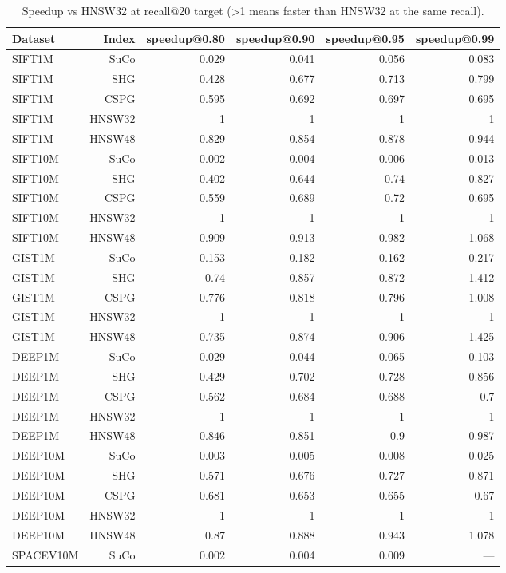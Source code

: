 \begin{table}[t]
\centering
\small
\caption{Speedup vs HNSW32 at recall@20 target (>1 means faster than HNSW32 at the same recall).}
\label{tab:speedup-k20}
\begin{tabular}{lrrrrr}
\toprule
Dataset & Index & speedup@0.80 & speedup@0.90 & speedup@0.95 & speedup@0.99 \\
\midrule
SIFT1M & SuCo & 0.029 & 0.041 & 0.056 & 0.083 \\
SIFT1M & SHG & 0.428 & 0.677 & 0.713 & 0.799 \\
SIFT1M & CSPG & 0.595 & 0.692 & 0.697 & 0.695 \\
SIFT1M & HNSW32 & 1 & 1 & 1 & 1 \\
SIFT1M & HNSW48 & 0.829 & 0.854 & 0.878 & 0.944 \\
SIFT10M & SuCo & 0.002 & 0.004 & 0.006 & 0.013 \\
SIFT10M & SHG & 0.402 & 0.644 & 0.74 & 0.827 \\
SIFT10M & CSPG & 0.559 & 0.689 & 0.72 & 0.695 \\
SIFT10M & HNSW32 & 1 & 1 & 1 & 1 \\
SIFT10M & HNSW48 & 0.909 & 0.913 & 0.982 & 1.068 \\
GIST1M & SuCo & 0.153 & 0.182 & 0.162 & 0.217 \\
GIST1M & SHG & 0.74 & 0.857 & 0.872 & 1.412 \\
GIST1M & CSPG & 0.776 & 0.818 & 0.796 & 1.008 \\
GIST1M & HNSW32 & 1 & 1 & 1 & 1 \\
GIST1M & HNSW48 & 0.735 & 0.874 & 0.906 & 1.425 \\
DEEP1M & SuCo & 0.029 & 0.044 & 0.065 & 0.103 \\
DEEP1M & SHG & 0.429 & 0.702 & 0.728 & 0.856 \\
DEEP1M & CSPG & 0.562 & 0.684 & 0.688 & 0.7 \\
DEEP1M & HNSW32 & 1 & 1 & 1 & 1 \\
DEEP1M & HNSW48 & 0.846 & 0.851 & 0.9 & 0.987 \\
DEEP10M & SuCo & 0.003 & 0.005 & 0.008 & 0.025 \\
DEEP10M & SHG & 0.571 & 0.676 & 0.727 & 0.871 \\
DEEP10M & CSPG & 0.681 & 0.653 & 0.655 & 0.67 \\
DEEP10M & HNSW32 & 1 & 1 & 1 & 1 \\
DEEP10M & HNSW48 & 0.87 & 0.888 & 0.943 & 1.078 \\
SPACEV10M & SuCo & 0.002 & 0.004 & 0.009 & — \\

\end{tabular}
\end{table}
